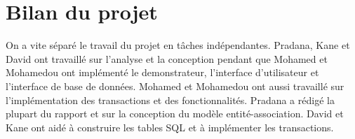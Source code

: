 \documentclass[12pt, a4paper]{article}
\begin{document}
\section{Bilan du projet}
On a vite séparé le travail du projet en tâches indépendantes.
Pradana, Kane et David ont travaillé sur l'analyse et la conception pendant que Mohamed et Mohamedou ont implémenté le demonstrateur, l'interface d'utilisateur et l'interface de base de données.
Mohamed et Mohamedou ont aussi travaillé sur l'implémentation des transactions et des fonctionnalités.
Pradana a rédigé la plupart du rapport et sur la conception du modèle entité-association.
David et Kane ont aidé à construire les tables SQL et à implémenter les transactions. 

\end{document}
